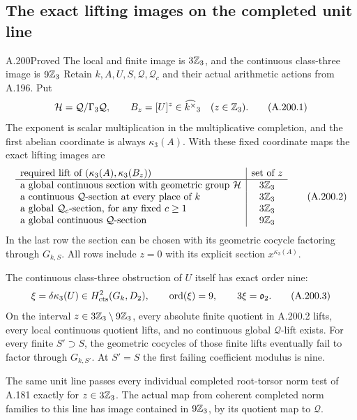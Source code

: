 \subsection{The exact lifting images on the completed unit line}

\begin{statement}{A.200}{Proved}
{The local and finite image is \(3\mathbb Z_3\), and the continuous class-three image is \(9\mathbb Z_3\)}
Retain \(k,A,U,S,\mathcal Q,\mathcal Q_c\) and their actual
arithmetic actions from A.196.  Put
\[
 \mathcal H=\mathcal Q/\Gamma_3\mathcal Q,\qquad
 B_z=[U]^z\in\widehat{k^\times}_3\quad(z\in\mathbb Z_3).
\tag{A.200.1}
\]
The exponent is scalar multiplication in the multiplicative
completion, and the first abelian coordinate is always
\(\kappa_3(A)\).  With these fixed coordinate maps the exact
lifting images are
\[
\begin{array}{l|c}
 \text{required lift of }(\kappa_3(A),\kappa_3(B_z))
       &\text{set of }z\\ \hline
 \text{a global continuous section with geometric group }\mathcal H
       &3\mathbb Z_3\\
 \text{a continuous }\mathcal Q\text{-section at every place of }k
       &3\mathbb Z_3\\
 \text{a global }\mathcal Q_c\text{-section, for any fixed }c\ge1
       &3\mathbb Z_3\\
 \text{a global continuous }\mathcal Q\text{-section}
       &9\mathbb Z_3
\end{array}
\tag{A.200.2}
\]
In the last row the section can be chosen with its geometric
cocycle factoring through \(G_{k,S}\).  All rows include
\(z=0\) with its explicit section \(x^{\kappa_3(A)}\).

The continuous class-three obstruction of \(U\) itself has
exact order nine:
\[
 \xi=\delta\kappa_3(U)\in H^2_{\rm cts}(G_k,D_2),
 \qquad \operatorname{ord}(\xi)=9,\qquad
 3\xi=\mathfrak o_2.
\tag{A.200.3}
\]
On the interval \(z\in3\mathbb Z_3\setminus9\mathbb Z_3\), every absolute
finite quotient in A.200.2 lifts, every local continuous
quotient lifts, and no continuous global \(\mathcal Q\)-lift
exists.  For every finite \(S'\supset S\), the geometric
cocycles of those finite lifts eventually fail to factor
through \(G_{k,S'}\).  At \(S'=S\) the first failing
coefficient modulus is nine.

The same unit line passes every individual completed
root-torsor norm test of A.181 exactly for \(z\in3\mathbb Z_3\).
The actual map from coherent completed norm families to
this line has image contained in \(9\mathbb Z_3\), by its quotient
map to \(\mathcal Q\).
\end{statement}

